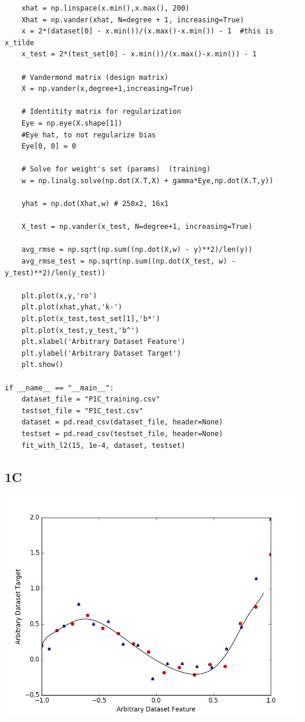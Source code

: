 \documentclass[12pt]{article}
\begin{document}
\begin{flushleft}
\begin{lstlisting}
	xhat = np.linspace(x.min(),x.max(), 200)
	Xhat = np.vander(xhat, N=degree + 1, increasing=True)
	x = 2*(dataset[0] - x.min())/(x.max()-x.min()) - 1  #this is x_tilde
	x_test = 2*(test_set[0] - x.min())/(x.max()-x.min()) - 1
	
	# Vandermond matrix (design matrix)
	X = np.vander(x,degree+1,increasing=True)
	
	# Identitity matrix for regularization
	Eye = np.eye(X.shape[1])
	#Eye hat, to not regularize bias
	Eye[0, 0] = 0
	
	# Solve for weight's set (params)  (training)
	w = np.linalg.solve(np.dot(X.T,X) + gamma*Eye,np.dot(X.T,y))
	
	yhat = np.dot(Xhat,w) # 250x2, 16x1
	
	X_test = np.vander(x_test, N=degree+1, increasing=True)
	
	avg_rmse = np.sqrt(np.sum((np.dot(X,w) - y)**2)/len(y))
	avg_rmse_test = np.sqrt(np.sum((np.dot(X_test, w) - y_test)**2)/len(y_test))
	
	plt.plot(x,y,'ro')
	plt.plot(xhat,yhat,'k-')
	plt.plot(x_test,test_set[1],'b*')
	plt.plot(x_test,y_test,'b^')
	plt.xlabel('Arbitrary Dataset Feature')
	plt.ylabel('Arbitrary Dataset Target')
	plt.show()

if __name__ == "__main__":
	dataset_file = "P1C_training.csv"
	testset_file = "P1C_test.csv"
	dataset = pd.read_csv(dataset_file, header=None)
	testset = pd.read_csv(testset_file, header=None)
	fit_with_l2(15, 1e-4, dataset, testset)
\end{lstlisting}
		
		\subsection*{1C}
		\includegraphics[scale=0.5]{HW1_1C.png}
		\label{fig:graph 1C}
		

\end{flushleft}
\end{document}

